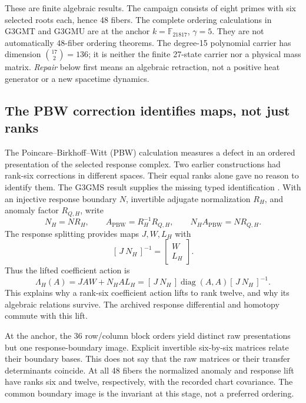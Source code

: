 \documentclass[11pt,a4paper]{article}
\begin{document}
These are finite algebraic results. The campaign consists of eight primes
with six selected roots each, hence 48 fibers. The complete ordering
calculations in G3GMT and G3GMU are at the anchor
\(k=\mathbb F_{21817}\), \(\gamma=5\). They are not automatically
48-fiber ordering theorems. The degree-15 polynomial carrier has dimension
\(\binom{17}{2}=136\); it is neither the finite 27-state carrier nor a
physical mass matrix. \emph{Repair} below first means an algebraic retraction,
not a positive heat generator or a new spacetime dynamics.

\subsection{The PBW correction identifies maps, not just ranks}
\label{sec:pbw-intertwiner}

The Poincare--Birkhoff--Witt (PBW) calculation measures a defect in an
ordered presentation of the selected response complex. Two earlier
constructions had rank-six corrections in different spaces. Their equal
ranks alone gave no reason to identify them.
The G3GMS result supplies the missing typed identification
\cite{UnifiedPBWIntertwiner2026}. With an injective response boundary \(N\),
invertible adjugate normalization \(R_H\), and anomaly factor \(R_{Q,H}\),
write
\[
 N_H=NR_H,\qquad
 A_{\mathrm{PBW}}=R_H^{-1}R_{Q,H},\qquad
 N_HA_{\mathrm{PBW}}=NR_{Q,H}.
 \tag{P1}\label{eq:pbw-normalization}
\]
The response splitting provides maps \(J,W,L_H\) with
\[
 [\,J\ N_H\,]^{-1}=
 \begin{bmatrix}W\\L_H\end{bmatrix}.
\]
Thus the lifted coefficient action is
\[
 \Lambda_H(A)=JAW+N_HAL_H
 =[\,J\ N_H\,]\operatorname{diag}(A,A)[\,J\ N_H\,]^{-1}.
 \tag{P2}\label{eq:pbw-response-lift}
\]
This explains why a rank-six coefficient action lifts to rank twelve,
and why its algebraic relations survive. The archived response
differential and homotopy commute with this lift.

At the anchor, the 36 row/column block orders yield distinct raw
presentations but one response-boundary image. Explicit invertible
six-by-six matrices relate their boundary bases. This does not say that
the raw matrices or their transfer determinants coincide. At all 48
fibers the normalized anomaly and response lift have ranks six and twelve,
respectively, with the recorded chart covariance. The common boundary
image is the invariant at this stage, not a preferred ordering.
\end{document}
